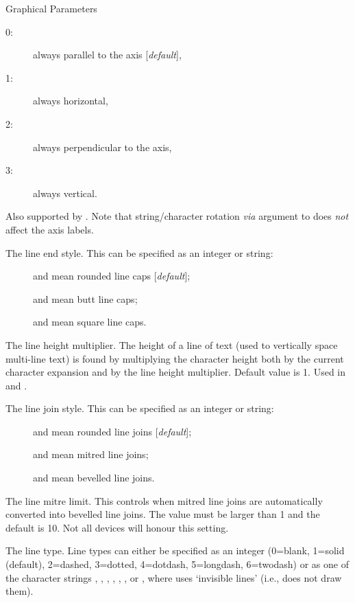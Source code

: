 \begin{Section}{Graphical Parameters}
\begin{description}
\begin{description}
\item[0:] always parallel to the axis [\emph{default}],
\item[1:] always horizontal,
\item[2:] always perpendicular to the axis,
\item[3:] always vertical.

\end{description}

Also supported by .  Note that
string/character rotation \emph{via} argument  to 
does \emph{not} affect the axis labels.

\item[\code{lend}] The line end style.  This can be specified as an
integer or string:
\begin{description}

\item[] and  mean rounded line caps
[\emph{default}];
\item[] and  mean butt line caps;
\item[] and  mean square line caps.

\end{description}


\item[\code{lheight}] The line height multiplier.
The height of a line of text (used to vertically space
multi-line text) is found by multiplying the character height
both by the current character expansion and by the
line height multiplier.  Default value is 1.  Used in
 and .
\item[\code{ljoin}] The line join style.
This can be specified as an integer or string:
\begin{description}

\item[] and  mean rounded line joins
[\emph{default}];
\item[] and  mean mitred line joins;
\item[] and  mean bevelled line joins.

\end{description}


\item[\code{lmitre}] The line mitre limit.  This controls when
mitred line joins are automatically converted into bevelled line
joins.  The value must be larger than 1 and the default is 10.
Not all devices will honour this setting.
\item[\code{lty}] The line type.
Line types can either be specified as an integer (0=blank, 1=solid
(default), 2=dashed, 3=dotted, 4=dotdash, 5=longdash, 6=twodash)
or as one of the character strings , ,
, , ,
, or , where  uses
`invisible lines' (i.e., does not draw them).


\end{description}
\end{Section}
